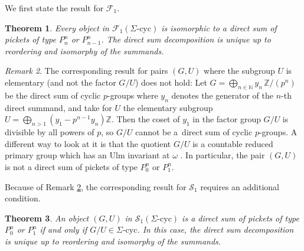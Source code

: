 \documentclass[twoside,leqno,12pt]{amsart}
\def\SigCyc{\mbox{$\Sigma$-cyc}}
\newtheorem{thm}{Theorem}[section]
\theoremstyle{definition}
\theoremstyle{remark}
\newtheorem{rem}[thm]{Remark}
\numberwithin{equation}{section}
\begin{document}
We first state the result for $\mathcal F_1$.


\begin{thm}
  \label{theorem-Fone}
  Every object in $\mathcal F_1(\SigCyc)$ is isomorphic to a direct sum
  of pickets of type $P^n_n$ or $P^n_{n-1}$.  The direct sum decomposition is unique
  up to reordering and isomorphy of the summands.
\end{thm}


\begin{rem}
  \label{remark2}
  The corresponding result for pairs $(G,U)$ where the subgroup $U$ is
  elementary 
  (and not the factor $G/U$) does not hold:
  Let $G=\bigoplus_{n\in\mathbb N} y_n\, \mathbb Z/(p^n)$ be the direct sum of cyclic $p$-groups
  where $y_n$ denotes the generator of the $n$-th direct
  summand, and take for $U$ the elementary subgroup
  $U=\bigoplus_{n>1} (y_1-p^{n-1}y_n)\mathbb Z$.
  Then the coset of $y_1$ in the factor group $G/U$ is divisible by all powers of $p$,
  so $G/U$ cannot be a~direct sum of cyclic $p$-groups.
  A different way to look at it is that
  the quotient $G/U$ is a countable reduced primary group which has
  an Ulm invariant at $\omega$ \cite[Remark (b) on p.\ 31]{kap}.
  In particular, the pair $(G,U)$ is not a direct sum of
  pickets of type $P_0^n$ or $P_1^n$.
\end{rem}


Because of Remark \ref{remark2},
  the corresponding result for $\mathcal S_1$ requires an additional condition.

\begin{thm} An object $(G,U)$ in $\mathcal S_1(\SigCyc)$ is a direct sum of pickets
    of type $P_0^n$ or $P_1^n$ if and only if $G/U\in\SigCyc$.  In this case,
  the direct sum decomposition is unique up to reordering and isomorphy of the summands.
\label{thm-s1}
\end{thm}
\end{document}
